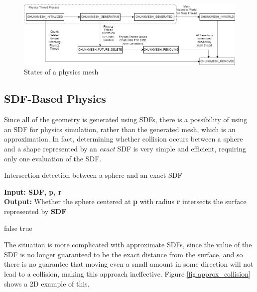 \documentclass[11pt]{article}
\begin{document}
 \begin{figure}[H]
  \includegraphics[width=\textwidth]{physics_states.png}
  \caption{States of a physics mesh}
  \label{fig:physics_states}
\end{figure}

\subsection{SDF-Based Physics}
Since all of the geometry is generated using SDFs, there is a possibility of using an SDF for physics simulation, rather than the generated mesh, which is an approximation. In fact, determining whether collision occurs between a sphere and a shape represented by an \textit{exact} SDF is very simple and efficient, requiring only one evaluation of the SDF.

\begin{algorithm}[H]
  \caption{Intersection detection between a sphere and an exact SDF}\label{alg:sdf_sphere_collision}
  \hspace*{\algorithmicindent} \textbf{Input: SDF, p, r} \\
  \hspace*{\algorithmicindent} \textbf{Output:} Whether the sphere centered at \textbf{p} with radius \textbf{r} intersects the surface represented by \textbf{SDF} 
  \begin{algorithmic}
   \State\Return false
  \Else \State \Return true
  \EndIf
  \end{algorithmic}
\end{algorithm}

The situation is more complicated with approximate SDFs, since the value of the SDF is no longer guaranteed to be the exact distance from the surface, and so there is no guarantee that moving even a small amount in some direction will not lead to a collision, making this approach ineffective. Figure \ref{fig:approx_collision} shows a 2D example of this.
\end{document}
